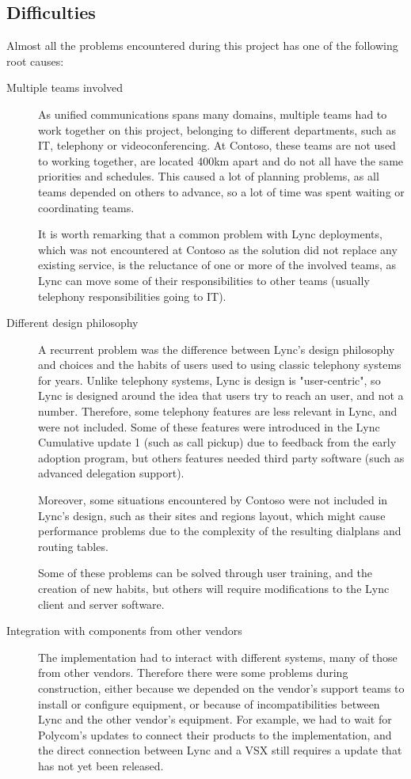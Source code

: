 \subsection{Difficulties}
	Almost all the problems encountered during this project has one of the following root causes:
	\begin{description}
		\item[Multiple teams involved] As unified communications spans many domains, multiple teams had to work together on this project, belonging to different departments, such as IT, telephony or videoconferencing. At Contoso, these teams are not used to working together, are located 400km apart and do not all have the same priorities and schedules. This caused a lot of planning problems, as all teams depended on others to advance, so a lot of time was spent waiting or coordinating teams.
		
		It is worth remarking that a common problem with Lync deployments, which was not encountered at Contoso as the solution did not replace any existing service, is the reluctance of one or more of the involved teams, as Lync can move some of their responsibilities to other teams (usually telephony responsibilities going to IT).
		
		\item[Different design philosophy] A recurrent problem was the difference between Lync's design philosophy and choices and the habits of users used to using classic telephony systems for years. Unlike telephony systems, Lync is design is "user-centric", so Lync is designed around the idea that users try to reach an user, and not a number. Therefore, some telephony features are less relevant in Lync, and were not included. Some of these features were introduced in the Lync Cumulative update 1 (such as call pickup) due to feedback from the early adoption program, but others features needed third party software (such as advanced delegation support).
		
		Moreover, some situations encountered by Contoso were not included in Lync's design, such as their sites and regions layout, which might cause performance problems due to the complexity of the resulting dialplans and routing tables.
		
		Some of these problems can be solved through user training, and the creation of new habits, but others will require modifications to the Lync client and server software.
		
		\item[Integration with components from other vendors] The implementation had to interact with different systems, many of those from other vendors. Therefore there were some problems during construction, either because we depended on the vendor's support teams to install or configure equipment, or because of incompatibilities between Lync and the other vendor's equipment. For example, we had to wait for Polycom's updates to connect their products to the implementation, and the direct connection between Lync and a VSX still requires a update that has not yet been released.
	\end{description}

